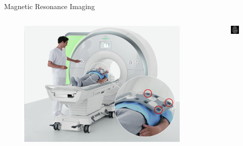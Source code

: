 \begin{frame}[c]{Magnetic Resonance Imaging}
	\begin{columns}[c, onlytextwidth]
		\begin{column}{0.4\textwidth}
			\centering{}
			\begin{figure}[k]
				\centering
				\includegraphics[width=\linewidth]{images/coils.jpg}
			\end{figure}
		\end{column}\begin{column}{0.4\textwidth}
			\begin{figure}[]
				\includegraphics[width=0.8\linewidth]{images/mri_brain_t2.png}
			\end{figure}
		\end{column}
	\end{columns}


\end{frame}
